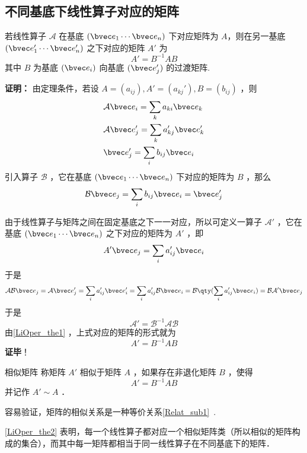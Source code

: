 \subsection{不同基底下线性算子对应的矩阵}
\begin{theorem}{}\label{LiOper_the2}
若线性算子 $\mathcal A$ 在基底 $(\bvec e_1\cdots \bvec e_n)$ 下对应矩阵为 $A$，则在另一基底  $(\bvec e'_1\cdots \bvec e'_n)$ 之下对应的矩阵 $A'$ 为
\begin{equation}
A'=B^{-1}AB
\end{equation}
其中 $B$ 为基底 $(\bvec e_i)$ 向基底 $(\bvec e_j')$ 的过渡矩阵.
\end{theorem}
\textbf{证明：}
由定理条件，若设 $A=(a_{ij}), A'=(a_{kj}'),B=(b_{ij})$ ，则
\begin{equation}
\begin{aligned}
&\mathcal{A}\bvec e_i=\sum_{k} a_{ki}\bvec e_k
\\
&\mathcal{A}\bvec e_j'=\sum_{k} a'_{kj}\bvec e'_k\\
&\bvec e_j'=\sum_i b_{ij}\bvec e_i
\end{aligned}
\end{equation}
引入算子 $\mathcal{B}$ ，它在基底 $(\bvec e_1\cdots \bvec e_n)$ 下对应的矩阵为 $B$ ，那么
\begin{equation}
\mathcal{B}\bvec e_j=\sum_i b_{ij}\bvec e_i=\bvec e_j'
\end{equation}

由于线性算子与矩阵之间在固定基底之下一一对应，所以可定义一算子 $\mathcal{A'}$ ，它在基底 $(\bvec e_1\cdots \bvec e_n)$ 之下对应的矩阵为 $A'$ ，即
\begin{equation}
A'\bvec e_j=\sum_i a'_{ij}\bvec e_i
\end{equation}
于是
\begin{equation}
\mathcal{AB}\bvec e_j=\mathcal{A}\bvec e'_j=\sum_i a'_{ij} \bvec e'_i=\sum_i a'_{ij}\mathcal{B}\bvec e_i=\mathcal{B}\qty(\sum_i a'_{ij}\bvec e_i)=\mathcal{BA'}\bvec e_j
\end{equation}
于是 
\begin{equation}
\mathcal{A'}=\mathcal{B}^{-1}\mathcal{AB}
\end{equation}
由\autoref{LiOper_the1} ，上式对应的矩阵的形式就为
\begin{equation}
A'=B^{-1}AB
\end{equation}
\textbf{证毕}！
\begin{definition}{相似矩阵}
称矩阵 $A'$ 相似于矩阵 $A$ ，如果存在非退化矩阵 $B$ ，使得
\begin{equation}
A'=B^{-1}AB
\end{equation}
并记作 $A'\sim A$ ．
\end{definition}
容易验证，矩阵的相似关系是一种等价关系\autoref{Relat_sub1}~.

\autoref{LiOper_the2} 表明，每一个线性算子都对应一个相似矩阵类（所以相似的矩阵构成的集合），而其中每一矩阵都相当于同一线性算子在不同基底下的矩阵．
